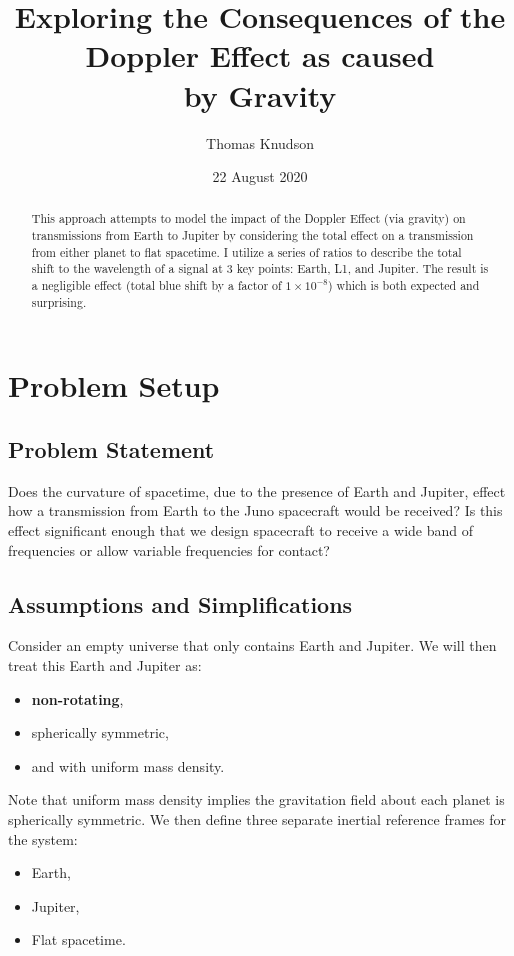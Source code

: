 \documentclass[]{report}
\title{Exploring the Consequences of the \\ Doppler Effect as caused \\ by Gravity}
\author{Thomas Knudson}
\date{22 August 2020}
\begin{document}
  \maketitle

  \begin{abstract}
    This approach attempts to model the impact of the Doppler Effect (via gravity) on transmissions from Earth to Jupiter by considering the total effect on a transmission from either planet to flat spacetime. I utilize a series of ratios to describe the total shift to the wavelength of a signal at 3 key points: Earth, L1, and Jupiter. The result is a negligible effect (total blue shift by a factor of $1\times10^{-8}$) which is both expected and surprising.
    \end{abstract}

  \chapter{Problem Setup}
    \section{Problem Statement}
      Does the curvature of spacetime, due to the presence of Earth and Jupiter, effect how a transmission from Earth to the Juno spacecraft would be received? Is this effect significant enough that we design spacecraft to receive a wide band of frequencies or allow variable frequencies for contact?

    \section{Assumptions and Simplifications}
      Consider an empty universe that only contains Earth and Jupiter. We will then treat this Earth and Jupiter as:

      \begin{itemize}
        \item \textbf{non-rotating},
        \item spherically symmetric,
        \item and with uniform mass density.
        \end{itemize}

      Note that uniform mass density implies the gravitation field about each planet is spherically symmetric. We then define three separate inertial reference frames for the system:

      \begin{itemize}
        \item Earth,
        \item Jupiter,
        \item Flat spacetime.
        \end{itemize}
\end{document}
